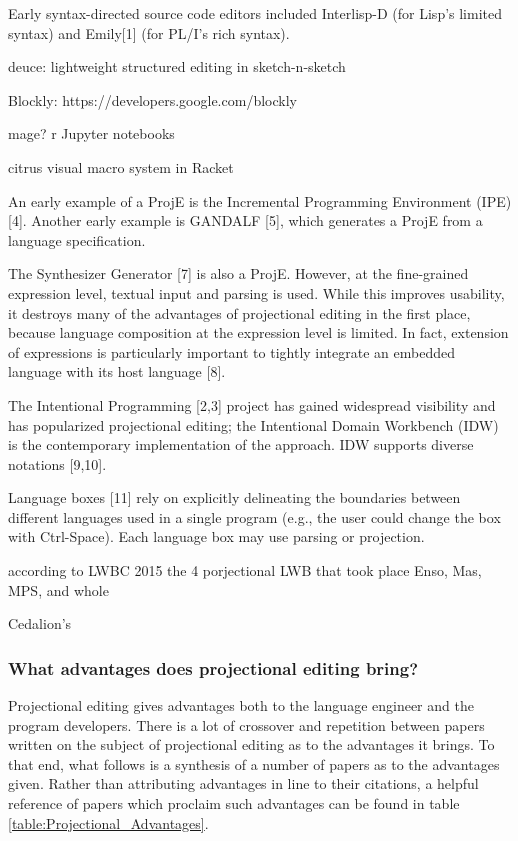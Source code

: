 Early syntax-directed source code editors included Interlisp-D (for Lisp’s limited syntax) and Emily[1] (for PL/I’s rich syntax).

deuce: lightweight structured editing in sketch-n-sketch

Blockly: https://developers.google.com/blockly

mage? r Jupyter notebooks

citrus
visual macro system in Racket


An early example of a ProjE is the Incremental Programming Environment (IPE) [4].
Another early example is GANDALF [5], which generates a ProjE from a language specification.

The Synthesizer Generator [7] is also a ProjE.
However, at the fine-grained expression level, textual input and parsing is used.
While this improves usability, it destroys many of the advantages of projectional editing in the first place, because language composition at the expression level is limited.
In fact, extension of expressions is particularly important to tightly integrate an embedded language with its host language [8].

The Intentional Programming [2,3] project has gained widespread visibility and has popularized projectional editing; the Intentional Domain Workbench (IDW) is the contemporary implementation of the approach.
IDW supports diverse notations [9,10].


Language boxes [11] rely on explicitly delineating the boundaries between different languages used in a single program (e.g., the user could change the box with Ctrl-Space).
Each language box may use parsing or projection.


according to LWBC 2015 the 4 porjectional LWB that took place Enso, Mas, MPS, and whole


Cedalion's 







\subsubsection{What advantages does projectional editing bring?}

Projectional editing gives advantages both to the language engineer and the program developers.
There is a lot of crossover and repetition between papers written on the subject of projectional editing as to the advantages it brings.
To that end, what follows is a synthesis of a number of papers as to the advantages given.
Rather than attributing advantages in line to their citations, a helpful reference of papers which proclaim such advantages can be found in table \ref{table:Projectional_Advantages}.

